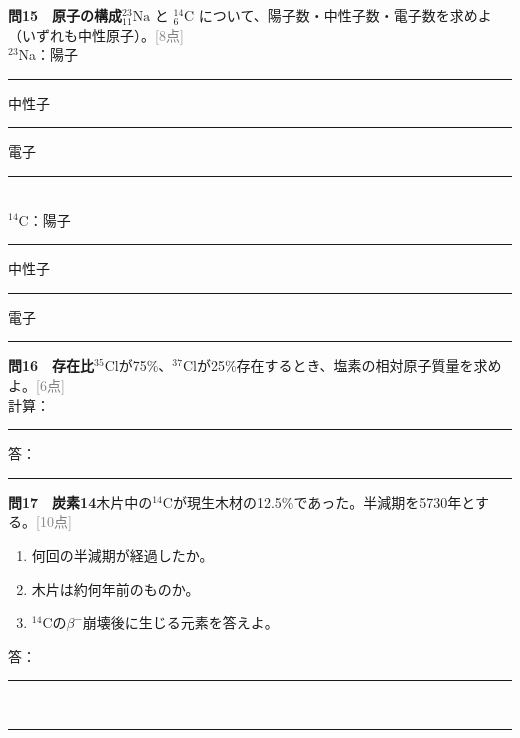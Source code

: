 \documentclass[11pt,a4paper]{ctexart}
\newcommand{\blank}[1]{\rule{#1}{0.4pt}}
\newcommand{\score}[1]{\hfill\textcolor{gray}{[#1点]}}
\newif\ifshowanswers
\newenvironment{qbox}{\begin{list}{}{\setlength{\leftmargin}{0pt}}\item\begin{minipage}{\linewidth}}{\end{minipage}\end{list}\vspace{3mm}}
\begin{document}
\begin{qbox}\textbf{問15　原子の構成}\quad ${}^{23}_{11}\mathrm{Na}$ と ${}^{14}_{6}\mathrm{C}$ について、陽子数・中性子数・電子数を求めよ（いずれも中性原子）。\score{8}\\[2mm]
${}^{23}$Na：陽子\blank{12mm} 中性子\blank{12mm} 電子\blank{12mm}\\[2mm]
${}^{14}$C：陽子\blank{12mm} 中性子\blank{12mm} 電子\blank{12mm}\end{qbox}

\begin{qbox}\textbf{問16　存在比}\quad ${}^{35}$Clが75\%、${}^{37}$Clが25\%存在するとき、塩素の相対原子質量を求めよ。\score{6}\\[3mm]
計算：\blank{130mm}\quad 答：\blank{24mm}\end{qbox}

\begin{qbox}\textbf{問17　炭素14}\quad 木片中の${}^{14}$Cが現生木材の12.5\%であった。半減期を5730年とする。\score{10}
\begin{enumerate}[label=(\arabic*),leftmargin=9mm]\item 何回の半減期が経過したか。\item 木片は約何年前のものか。\item ${}^{14}$Cの$\beta^-$崩壊後に生じる元素を答えよ。\end{enumerate}
答：\blank{150mm}\\[3mm]\blank{150mm}\end{qbox}

\ifshowanswers
\clearpage
\end{document}

